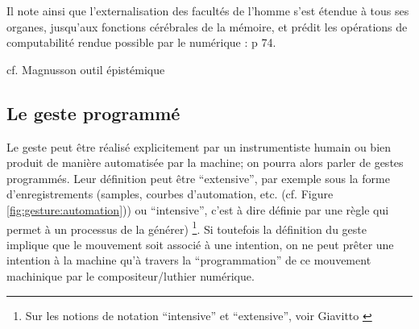 Il note ainsi que l’externalisation des facultés de l’homme s’est étendue à tous ses organes, jusqu'aux fonctions cérébrales de la mémoire, et prédit les opérations de computabilité rendue possible par le numérique :
 \cite{leroi-gourhan_geste_1964} p 74.

cf. Magnusson outil épistémique

\subsection{Le geste programmé}
\label{sec:gesture:instrumental_to_musical:geste_programme}

Le geste peut être réalisé explicitement par un instrumentiste humain ou bien produit de manière automatisée par la machine; on pourra alors parler de gestes programmés. Leur définition peut être ``extensive'', par exemple sous la forme d'enregistrements (samples, courbes d'automation, etc. (cf. Figure \ref{fig:gesture:automation})) ou ``intensive'', c'est à dire définie par une règle qui permet à un processus de la générer) \footnote{Sur les notions de notation ``intensive'' et ``extensive'', voir Giavitto \cite{giavitto_du_2014}}. Si toutefois la définition du geste implique que le mouvement soit associé à une intention, on ne peut prêter une intention à la machine qu'à travers la ``programmation'' de ce mouvement machinique par le compositeur/luthier numérique.

